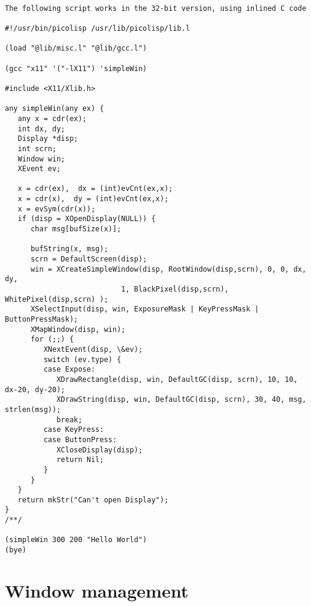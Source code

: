 \begin{verbatim}

The following script works in the 32-bit version, using inlined C code

#!/usr/bin/picolisp /usr/lib/picolisp/lib.l

(load "@lib/misc.l" "@lib/gcc.l")

(gcc "x11" '("-lX11") 'simpleWin)

#include <X11/Xlib.h>

any simpleWin(any ex) {
   any x = cdr(ex);
   int dx, dy;
   Display *disp;
   int scrn;
   Window win;
   XEvent ev;

   x = cdr(ex),  dx = (int)evCnt(ex,x);
   x = cdr(x),  dy = (int)evCnt(ex,x);
   x = evSym(cdr(x));
   if (disp = XOpenDisplay(NULL)) {
      char msg[bufSize(x)];

      bufString(x, msg);
      scrn = DefaultScreen(disp);
      win = XCreateSimpleWindow(disp, RootWindow(disp,scrn), 0, 0, dx, dy,
                           1, BlackPixel(disp,scrn), WhitePixel(disp,scrn) );
      XSelectInput(disp, win, ExposureMask | KeyPressMask | ButtonPressMask);
      XMapWindow(disp, win);
      for (;;) {
         XNextEvent(disp, \&ev);
         switch (ev.type) {
         case Expose:
            XDrawRectangle(disp, win, DefaultGC(disp, scrn), 10, 10, dx-20, dy-20);
            XDrawString(disp, win, DefaultGC(disp, scrn), 30, 40, msg, strlen(msg));
            break;
         case KeyPress:
         case ButtonPress:
            XCloseDisplay(disp);
            return Nil;
         }
      }
   }
   return mkStr("Can't open Display");
}
/**/

(simpleWin 300 200 "Hello World")
(bye)

\end{verbatim}

\section*{Window management}

